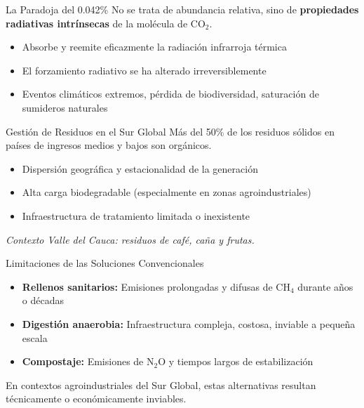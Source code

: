 \documentclass[aspectratio=169, 11pt]{beamer}
\begin{document}
\begin{frame}{La Paradoja del 0.042\%}
    No se trata de abundancia relativa, sino de \textbf{propiedades radiativas intrínsecas} de la molécula de CO$_2$.
    \vspace{0.3cm}
    \begin{itemize}
        \item Absorbe y reemite eficazmente la radiación infrarroja térmica
        \item El forzamiento radiativo se ha alterado irreversiblemente
        \item Eventos climáticos extremos, pérdida de biodiversidad, saturación de sumideros naturales
    \end{itemize}
\end{frame}

\begin{frame}{Gestión de Residuos en el Sur Global}
    Más del 50\% de los residuos sólidos en países de ingresos medios y bajos son orgánicos.
    \vspace{0.3cm}
    \begin{itemize}
        \item Dispersión geográfica y estacionalidad de la generación
        \item Alta carga biodegradable (especialmente en zonas agroindustriales)
        \item Infraestructura de tratamiento limitada o inexistente
    \end{itemize}
    \vspace{0.3cm}
    \centering
    \footnotesize \textit{Contexto Valle del Cauca: residuos de café, caña y frutas.}
\end{frame}

\begin{frame}{Limitaciones de las Soluciones Convencionales}
    \begin{itemize}
        \item \textbf{Rellenos sanitarios:} Emisiones prolongadas y difusas de CH$_4$ durante años o décadas
        \item \textbf{Digestión anaerobia:} Infraestructura compleja, costosa, inviable a pequeña escala
        \item \textbf{Compostaje:} Emisiones de N$_2$O y tiempos largos de estabilización
    \end{itemize}
    \vspace{0.3cm}
    En contextos agroindustriales del Sur Global, estas alternativas resultan técnicamente o económicamente inviables.
\end{frame}
\end{document}
